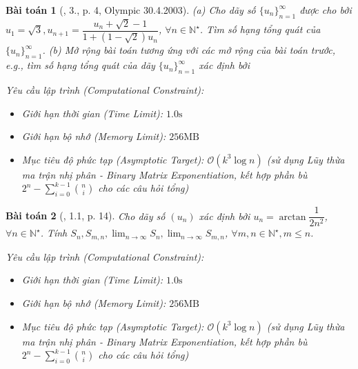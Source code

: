 \documentclass{article}
\newtheorem{baitoan}{Bài toán}
\begin{document}
\begin{baitoan}[\cite{Chung_day_so}, 3., p. 4, Olympic 30.4.2003]
	(a) Cho dãy số $\{u_n\}_{n=1}^\infty$ được cho bởi $u_1 = \sqrt{3},u_{n+1} = \dfrac{u_n + \sqrt{2} - 1}{1 + (1 - \sqrt{2})u_n}$, $\forall n\in\mathbb{N}^\star$. Tìm số hạng tổng quát của $\{u_n\}_{n=1}^\infty$. (b) Mở rộng bài toán tương ứng với các mở rộng của bài toán trước, e.g., tìm số hạng tổng quát của dãy $\{u_n\}_{n=1}^\infty$ xác định bởi 

    \vspace{0.5em}
    \emph{Yêu cầu lập trình (Computational Constraint):}
    \begin{itemize}
        \item Giới hạn thời gian (Time Limit): $1.0\mathrm{s}$
        \item Giới hạn bộ nhớ (Memory Limit): $256\mathrm{MB}$
        \item Mục tiêu độ phức tạp (Asymptotic Target): $\mathcal{O}(k^3 \log n)$ (sử dụng Lũy thừa ma trận nhị phân - Binary Matrix Exponentiation, kết hợp phần bù $2^n - \sum_{i=0}^{k-1} \binom{n}{i}$ cho các câu hỏi tổng)
    \end{itemize}
\end{baitoan}


\begin{baitoan}[\cite{Quoc_Long_Dat_Nam_VMC}, 1.1, p. 14]
	Cho dãy số $(u_n)$ xác định bởi $u_n = \arctan\dfrac{1}{2n^2}$, $\forall n\in\mathbb{N}^\star$. Tính $S_n,S_{m,n},\lim_{n\to\infty} S_n,\lim_{n\to\infty} S_{m,n}$, $\forall m,n\in\mathbb{N}^\star,m\le n$.

    \vspace{0.5em}
    \emph{Yêu cầu lập trình (Computational Constraint):}
    \begin{itemize}
        \item Giới hạn thời gian (Time Limit): $1.0\mathrm{s}$
        \item Giới hạn bộ nhớ (Memory Limit): $256\mathrm{MB}$
        \item Mục tiêu độ phức tạp (Asymptotic Target): $\mathcal{O}(k^3 \log n)$ (sử dụng Lũy thừa ma trận nhị phân - Binary Matrix Exponentiation, kết hợp phần bù $2^n - \sum_{i=0}^{k-1} \binom{n}{i}$ cho các câu hỏi tổng)
    \end{itemize}
\end{baitoan}
\end{document}

